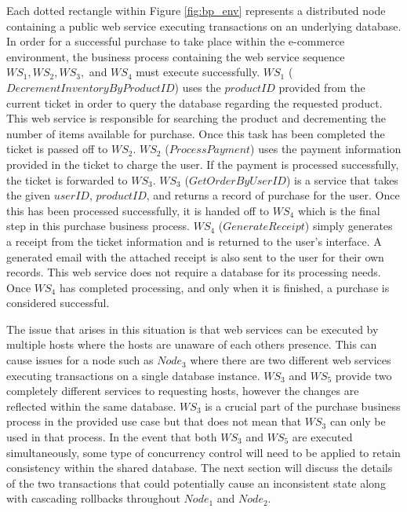 \documentclass[conference]{IEEEtran}
\begin{document}
Each dotted rectangle within Figure \ref{fig:bp_env} represents a distributed node containing a public web service executing transactions on an underlying database. In order for a successful purchase to take place within the e-commerce environment, the business process containing the web service sequence $WS_{1}, WS_{2}, WS_{3},$ and $WS_{4}$ must execute successfully. $WS_{1}$ ($DecrementInventoryByProductID$) uses the $productID$ provided from the current ticket in order to query the database regarding the requested product. This web service is responsible for searching the product and decrementing the number of items available for purchase. Once this task has been completed the ticket is passed off to $WS_{2}$. $WS_{2}$ ($ProcessPayment$) uses the payment information provided in the ticket to charge the user. If the payment is processed successfully, the ticket is forwarded to $WS_{3}$. $WS_{3}$ ($GetOrderByUserID$) is a service that takes the given $userID$, $product ID$, and returns a record of purchase for the user. Once this has been processed successfully, it is handed off to $WS_{4}$ which is the final step in this purchase business process. $WS_{4}$ ($GenerateReceipt$) simply generates a receipt from the ticket information and is returned to the user's interface. A generated email with the attached receipt is also sent to the user for their own records. This web service does not require a database for its processing needs. Once $WS_{4}$ has completed processing, and only when it is finished, a purchase is considered successful.

The issue that arises in this situation is that web services can be executed by multiple hosts where the hosts are unaware of each others presence. This can cause issues for a node such as $Node_{3}$ where there are two different web services executing transactions on a single database instance. $WS_{3}$ and $WS_{5}$ provide two completely different services to requesting hosts, however the changes are reflected within the same database. $WS_{3}$ is a crucial part of the purchase business process in the provided use case but that does not mean that $WS_{3}$ can only be used in that process. In the event that both $WS_{3}$ and $WS_{5}$ are executed simultaneously, some type of concurrency control will need to be applied to retain consistency within the shared database. The next section will discuss the details of the two transactions that could potentially cause an inconsistent state along with cascading rollbacks throughout $Node_{1}$ and $Node_{2}$.
\end{document}
